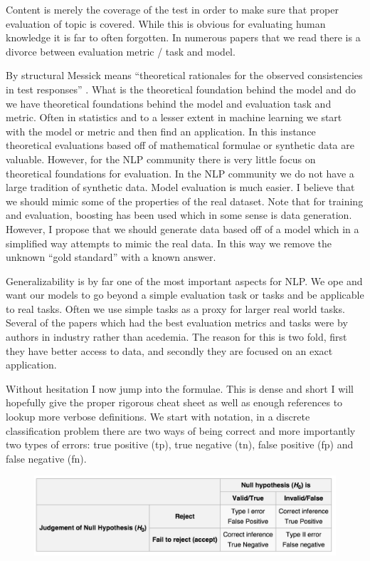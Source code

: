 \documentclass[11pt]{article}
\begin{document}
Content is merely the coverage of the test in order to make sure that proper evaluation of topic is covered. While this is obvious for evaluating human knowledge it is far to often forgotten. In numerous papers that we read there is a divorce between evaluation metric / task and model. 

By structural Messick means
``theoretical rationales
for the observed consistencies in test responses'' \cite{messick1995validity}. What is the theoretical foundation behind the model and do we have theoretical foundations behind the model and evaluation task and metric. Often in statistics and to a lesser extent in machine learning we start with the model or metric and then find an application. In this instance theoretical evaluations based off of mathematical formulae or synthetic data are valuable. However, for the NLP community there is very little focus on theoretical foundations for evaluation. In the NLP community we do not have a large tradition of synthetic data. Model evaluation is much easier. I believe that we should mimic some of the properties of the real dataset. Note that for training and evaluation, boosting has been used which in some sense is data generation. However, I propose that we should generate data based off of a model which in a simplified way attempts to mimic the real data. In this way we remove the unknown ``gold standard'' with a known answer. 

Generalizability is by far one of the most important aspects for NLP. We ope and want our models to go beyond a simple evaluation task or tasks and be applicable to real tasks.
Often we use simple tasks as a proxy for larger real world tasks. Several of the papers which had the best evaluation metrics and tasks were by authors in industry rather than acedemia. The reason for this is two fold, first they have better access to data, and secondly they are focused on an exact application. 

Without hesitation I now jump into the formulae. This is dense and short I will hopefully give the proper rigorous cheat sheet as well as enough references to lookup more verbose definitions.
We start with notation, in a discrete classification problem there are two ways of being correct and more importantly two types of errors: true positive (tp), true negative (tn), false positive (fp) and false negative (fn). 

\begin{figure}[ht]
\includegraphics{hypothesis_testing.png}
\end{figure}
\end{document}
